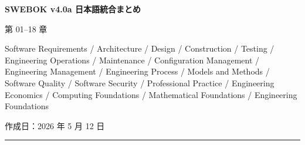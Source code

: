 \documentclass[a4paper,11pt]{ltjsarticle}
\numberwithin{figure}{section}
\numberwithin{table}{section}
\begin{document}
\thispagestyle{empty}

\begin{center}

{\LARGE\bfseries SWEBOK v4.0a 日本語統合まとめ}\par\vspace{1em}

{\Large 第 01--18 章}\par\vspace{0.8em}

{\large Software Requirements / Architecture / Design / Construction / Testing / Engineering Operations / Maintenance / Configuration Management / Engineering Management / Engineering Process / Models and Methods / Software Quality / Software Security / Professional Practice / Engineering Economics / Computing Foundations / Mathematical Foundations / Engineering Foundations}\par\vspace{1em}

{作成日：2026 年 5 月 12 日}\par

\end{center}

\vspace{1em}\hrule\vspace{0.8em}

\tableofcontents

\clearpage


























\end{document}
